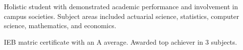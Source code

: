 \documentclass[10pt,a4paper,ragged2e,withhyper]{altacv}
\begin{document}
\begin{paracol}{2}
            \divider
            
	    Holistic student with demonstrated academic performance and involvement in campus societies. Subject areas included actuarial science, statistics, computer science, mathematics, and economics.

            \divider

	      IEB matric certificate with an A average. Awarded top achiever in 3 subjects.

        

    \end{paracol}
\end{document}
